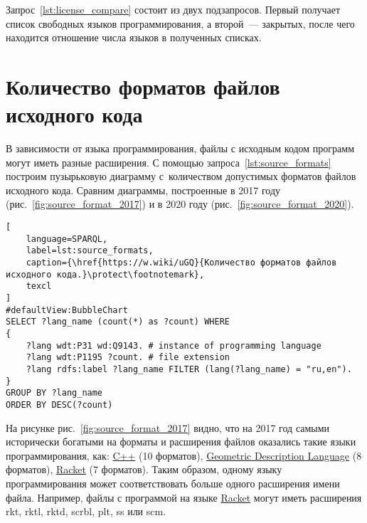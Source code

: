 Запрос~\ref{lst:license_compare} состоит из двух подзапросов. 
Первый получает список свободных языков программирования, 
а второй~--- закрытых, после чего находится отношение числа языков в полученных списках.




\newpage
\section{Количество форматов файлов исходного кода}
%
%
%
В зависимости от языка программирования, 
файлы с исходным кодом программ могут иметь разные расширения. 
С помощью запроса~\ref{lst:source_formats} построим пузырьковую диаграмму 
с~количеством допустимых форматов файлов исходного кода. 
Сравним диаграммы, построенные в 2017 году (рис.~\ref{fig:source_format_2017}) 
и в 2020 году (рис.~\ref{fig:source_format_2020}). 


\begin{lstlisting}[
	language=SPARQL,
	label=lst:source_formats,
	caption={\href{https://w.wiki/uGQ}{Количество форматов файлов исходного кода.}\protect\footnotemark},
	texcl
]
#defaultView:BubbleChart
SELECT ?lang_name (count(*) as ?count) WHERE
{
    ?lang wdt:P31 wd:Q9143. # instance of programming language
 	?lang wdt:P1195 ?count. # file extension
 	?lang rdfs:label ?lang_name FILTER (lang(?lang_name) = "ru,en").
}
GROUP BY ?lang_name 
ORDER BY DESC(?count)
\end{lstlisting}

На рисунке рис.~\ref{fig:source_format_2017} видно, что на 2017 год самыми исторически богатыми на форматы и расширения файлов оказались такие языки программирования, как: \href{https://en.wikipedia.org/wiki/C++}{C++} (10 форматов), \href{https://en.wikipedia.org/wiki/Geometric_Description_Language}{Geometric Description Language} (8 форматов), \href{https://en.wikipedia.org/wiki/Racket_(programming_language)}{Racket} (7 форматов). Таким образом, одному языку программирования может соответствовать больше одного расширения имени файла. Например, файлы с программой на языке \href{https://en.wikipedia.org/wiki/Racket_(programming_language)}{Racket} могут иметь расширения rkt, rktl, rktd, scrbl, plt, ss или scm.


